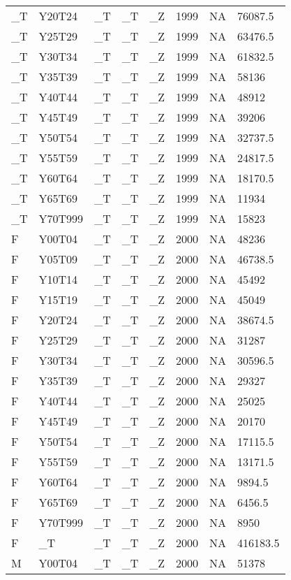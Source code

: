 \begin{longtable}[t]{llllllll}
\_T & Y20T24 & \_T & \_T & \_Z & 1999 & NA & 76087.5\\
\addlinespace
\_T & Y25T29 & \_T & \_T & \_Z & 1999 & NA & 63476.5\\
\_T & Y30T34 & \_T & \_T & \_Z & 1999 & NA & 61832.5\\
\_T & Y35T39 & \_T & \_T & \_Z & 1999 & NA & 58136\\
\_T & Y40T44 & \_T & \_T & \_Z & 1999 & NA & 48912\\
\_T & Y45T49 & \_T & \_T & \_Z & 1999 & NA & 39206\\
\addlinespace
\_T & Y50T54 & \_T & \_T & \_Z & 1999 & NA & 32737.5\\
\_T & Y55T59 & \_T & \_T & \_Z & 1999 & NA & 24817.5\\
\_T & Y60T64 & \_T & \_T & \_Z & 1999 & NA & 18170.5\\
\_T & Y65T69 & \_T & \_T & \_Z & 1999 & NA & 11934\\
\_T & Y70T999 & \_T & \_T & \_Z & 1999 & NA & 15823\\
\addlinespace
F & Y00T04 & \_T & \_T & \_Z & 2000 & NA & 48236\\
F & Y05T09 & \_T & \_T & \_Z & 2000 & NA & 46738.5\\
F & Y10T14 & \_T & \_T & \_Z & 2000 & NA & 45492\\
F & Y15T19 & \_T & \_T & \_Z & 2000 & NA & 45049\\
F & Y20T24 & \_T & \_T & \_Z & 2000 & NA & 38674.5\\
\addlinespace
F & Y25T29 & \_T & \_T & \_Z & 2000 & NA & 31287\\
F & Y30T34 & \_T & \_T & \_Z & 2000 & NA & 30596.5\\
F & Y35T39 & \_T & \_T & \_Z & 2000 & NA & 29327\\
F & Y40T44 & \_T & \_T & \_Z & 2000 & NA & 25025\\
F & Y45T49 & \_T & \_T & \_Z & 2000 & NA & 20170\\
\addlinespace
F & Y50T54 & \_T & \_T & \_Z & 2000 & NA & 17115.5\\
F & Y55T59 & \_T & \_T & \_Z & 2000 & NA & 13171.5\\
F & Y60T64 & \_T & \_T & \_Z & 2000 & NA & 9894.5\\
F & Y65T69 & \_T & \_T & \_Z & 2000 & NA & 6456.5\\
F & Y70T999 & \_T & \_T & \_Z & 2000 & NA & 8950\\
\addlinespace
F & \_T & \_T & \_T & \_Z & 2000 & NA & 416183.5\\
M & Y00T04 & \_T & \_T & \_Z & 2000 & NA & 51378\\

\end{longtable}
